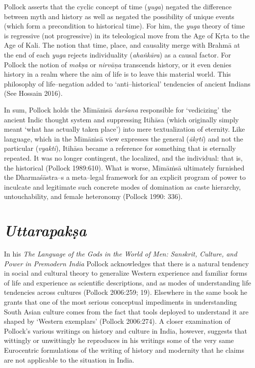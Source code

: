 Pollock asserts that the cyclic concept of time (\textit{yuga}) negated the difference between myth and history as well as negated the possibility of unique events (which form a precondition to historical time). For him, the \textit{yuga} theory of time is regressive (not progressive) in its teleological move from the Age of Kṛta to the Age of Kali. The notion that time, place, and causality merge with Brahmā at the end of each \textit{yuga} rejects individuality (\textit{ahaṅkāra}) as a causal factor. For Pollock the notion of \textit{mokṣa} or \textit{nirvāṇa} transcends history, or it even denies history in a realm where the aim of life is to leave this material world. This philosophy of life–negation added to ‘anti–historical’ tendencies of ancient Indians (See Hossain 2016).

In sum, Pollock holds the Mīmāṁsā \textit{darśana} responsible for ‘vedicizing’ the ancient Indic thought system and suppressing Itihāsa (which originally simply meant ‘what has actually taken place’) into mere textualization of eternity. Like language, which in the Mīmāṁsā view expresses the general (\textit{ākṛti}) and not the particular (\textit{vyakti}), Itihāsa became a reference for something that is eternally repeated. It was no longer contingent, the localized, and the individual: that is, the historical (Pollock 1989:610). What is worse, Mīmāṁsā ultimately furnished the Dharmaśāstra–s a meta–legal framework for an explicit program of power to inculcate and legitimate such concrete modes of domination as caste hierarchy, untouchability, and female heteronomy (Pollock 1990: 336).


\section*{\textit{Uttarapakṣa}}

In his \textit{The Language of the Gods in the World of Men: Sanskrit, Culture, and Power in Premodern India} Pollock acknowledges that there is a natural tendency in social and cultural theory to generalize Western experience and familiar forms of life and experience as scientific descriptions, and as modes of understanding life tendencies across cultures (Pollock 2006:259; 19). Elsewhere in the same book he grants that one of the most serious conceptual impediments in understanding South Asian culture comes from the fact that tools deployed to understand it are shaped by ‘Western exemplars’ (Pollock 2006:274). A closer examination of Pollock’s various writings on history and culture in India, however, suggests that wittingly or unwittingly he reproduces in his writings some of the very same Eurocentric formulations of the writing of history and modernity that he claims are not applicable to the situation in India.

